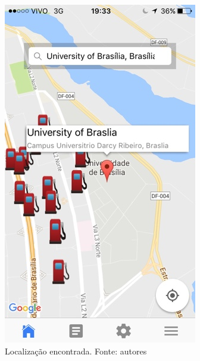 \begin{anexosenv}
\begin{figure}[H]
    \centering
    \includegraphics[scale=0.5]{figuras/app_4.jpg}
    \caption[Localização encontrada]{Localização encontrada. Fonte: autores}
    \label{img:localizacao_encontrada}
\end{figure}


\end{anexosenv}
